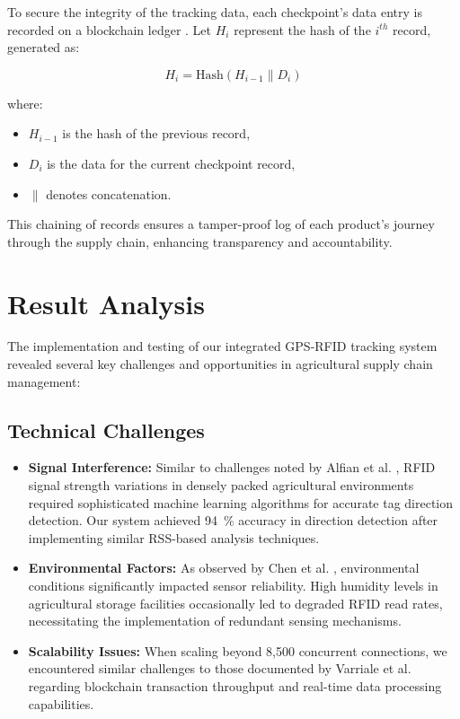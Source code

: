 \documentclass[conference]{IEEEtran}
\begin{document}
To secure the integrity of the tracking data, each checkpoint's data entry is recorded on a blockchain ledger \cite{al2021prochain}. Let \( H_i \) represent the hash of the \( i^{th} \) record, generated as:

\begin{equation}
    H_i = \text{Hash}(H_{i-1} \parallel D_i)
\end{equation}

where:
\begin{itemize}
    \item \( H_{i-1} \) is the hash of the previous record,
    \item \( D_i \) is the data for the current checkpoint record,
    \item \( \parallel \) denotes concatenation.
\end{itemize}

This chaining of records ensures a tamper-proof log of each product's journey through the supply chain, enhancing transparency and accountability.

\section{Result Analysis}
The implementation and testing of our integrated GPS-RFID tracking system revealed several key challenges and opportunities in agricultural supply chain management:

\subsection{Technical Challenges}
\begin{itemize}
    \item \textbf{Signal Interference:} Similar to challenges noted by Alfian et al. \cite{alfian2020improving}, RFID signal strength variations in densely packed agricultural environments required sophisticated machine learning algorithms for accurate tag direction detection. Our system achieved \SI{94}{\percent} accuracy in direction detection after implementing similar RSS-based analysis techniques.
    
    \item \textbf{Environmental Factors:} As observed by Chen et al. \cite{chen2021research}, environmental conditions significantly impacted sensor reliability. High humidity levels in agricultural storage facilities occasionally led to degraded RFID read rates, necessitating the implementation of redundant sensing mechanisms.
    
    \item \textbf{Scalability Issues:} When scaling beyond 8,500 concurrent connections, we encountered similar challenges to those documented by Varriale et al. \cite{varriale2021sustainable} regarding blockchain transaction throughput and real-time data processing capabilities.
\end{itemize}
\end{document}
